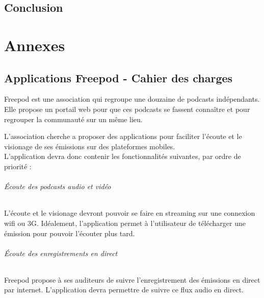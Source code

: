 \documentclass[11pt, french]{report}
\begin{document}

\chapter*{Conclusion}



 

\part*{Annexes}

\appendix

\chapter{Applications Freepod - Cahier des charges}

Freepod est une association qui regroupe une douzaine de podcasts indépendants. Elle propose un portail web pour que ces podcasts se fassent connaître et pour regrouper la communauté sur un même lieu.

L’association cherche a proposer des applications pour faciliter l’écoute et le visionage de ses émissions sur des plateformes mobiles.\\

L’application devra donc contenir les fonctionnalités suivantes, par ordre de priorité :

\paragraph{Écoute des podcasts audio et vidéo}
L’écoute et le visionage devront pouvoir se faire en streaming sur une connexion wifi ou 3G. Idéalement, l’application permet à l’utilisateur de télécharger une émission pour pouvoir l’écouter plus tard.

\paragraph{Écoute des enregistrements en direct}
Freepod propose à ses auditeurs de suivre l’enregistrement des émissions en direct par internet. L’application devra permettre de suivre ce flux audio en direct.
\end{document}
